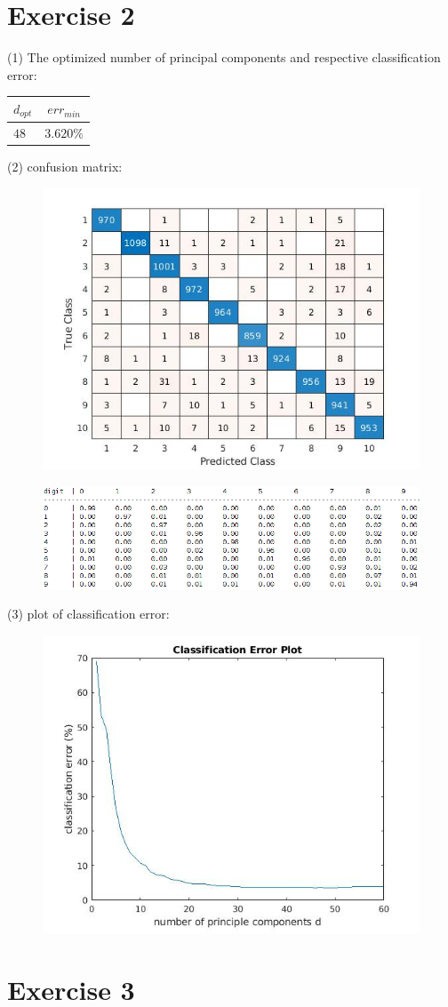 \documentclass{article}
\begin{document}
\section*{Exercise 2}
(1) The optimized number of principal components and respective classification error:
\begin{center}
	\begin{tabular}{ l | c }
		\hline
		$d_{opt}$ & $err_{min}$ \\ \hline		
		$48$ & $3.620\%$ \\ \hline
	\end{tabular}
\end{center}
(2) confusion matrix:
\begin{figure}[ht]
	\centering
	\includegraphics[width=0.7\linewidth]{confusionMat.jpg}  
	\label{fig:sub-first}
\end{figure}
\begin{figure}[ht]
	\centering
	\includegraphics[width=1\linewidth]{helper.png}  
	\label{fig:sub-first}
\end{figure}
\newpage
(3) plot of classification error:
\begin{figure}[ht]
	\centering
	\includegraphics[width=0.8\linewidth]{error.jpg}  
	\label{fig:sub-first}
\end{figure}

\newpage
\section*{Exercise 3}
\end{document}
